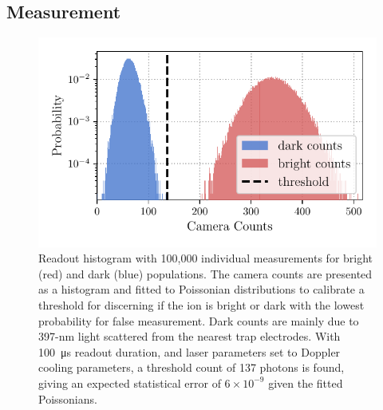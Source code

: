 \subsection{Measurement}
\label{sec:Measurement}
    \begin{figure}
        \begin{center}
        \noindent\includegraphics[width=0.75\linewidth]{
            figures/pdf_figure/readout_hist.pdf
            }
        \end{center}
        \caption{
            Readout histogram with 100,000 individual measurements for bright (red) and dark (blue) populations. The camera counts are presented as a histogram and fitted to Poissonian distributions to calibrate a threshold for discerning if the ion is bright or dark with the lowest probability for false measurement. Dark counts are mainly due to 397-nm light scattered from the nearest trap electrodes. With 100~\unit{\us} readout duration, and laser parameters set to Doppler cooling parameters, a threshold count of 137 photons is found, giving an expected statistical error of $6\times 10^{-9}$ given the fitted Poissonians. %
            }
        \label{fig:readout_histogram}
    \end{figure}

